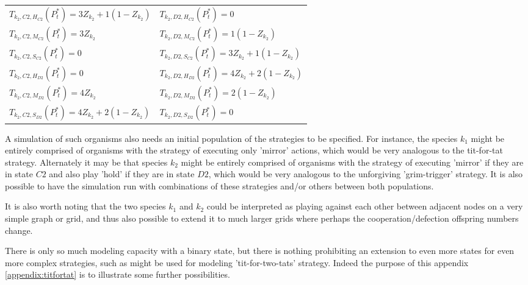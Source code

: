 \begin{itemize}[leftmargin=*,labelsep=4mm]
\begin{tabular}{ll}\hline
$T_{k_2,C2,H_{C2}}(P^*_t) = 3Z_{k_2}+1(1-Z_{k_2})$ & 	$T_{k_2,D2,H_{C2}}(P^*_t) = 0$\\
$T_{k_2,C2,M_{C2}}(P^*_t) = 3Z_{k_2}$ & 				$T_{k_2,D2,M_{C2}}(P^*_t) = 1(1-Z_{k_2})$\\
$T_{k_2,C2,S_{C2}}(P^*_t) = 0$ & 						$T_{k_2,D2,S_{C2}}(P^*_t) = 3Z_{k_2}+1(1-Z_{k_2})$\\\hline

$T_{k_2,C2,H_{D2}}(P^*_t) = 0$ & 						$T_{k_2,D2,H_{D2}}(P^*_t) = 4Z_{k_2}+2(1-Z_{k_2})$\\
$T_{k_2,C2,M_{D2}}(P^*_t) = 4Z_{k_2}$ & 				$T_{k_2,D2,M_{D2}}(P^*_t) = 2(1-Z_{k_2})$\\
$T_{k_2,C2,S_{D2}}(P^*_t) = 4Z_{k_2}+2(1-Z_{k_2})$ &	$T_{k_2,D2,S_{D2}}(P^*_t) = 0$\\\hline
\end{tabular}
\end{itemize}

A simulation of such organisms also needs an initial population of the strategies to be specified.
For instance, the species $k_1$ might be entirely comprised of organisms with the strategy of executing only 'mirror' actions, which would be very analogous to the tit-for-tat strategy.
Alternately it may be that species $k_2$ might be entirely comprised of organisms with the strategy of executing 'mirror' if they are in state $C2$ and also play 'hold' if they are in state $D2$, which would be very analogous to the unforgiving 'grim-trigger' strategy.
It is also possible to have the simulation run with combinations of these strategies and/or others between both populations.

It is also worth noting that the two species $k_1$ and $k_2$ could be interpreted as playing against each other between adjacent nodes on a very simple graph or grid, and thus also possible to extend it to much larger grids where perhaps the cooperation/defection offspring numbers change.

There is only so much modeling capacity with a binary state, but there is nothing prohibiting an extension to even more states for even more complex strategies, such as might be used for modeling 'tit-for-two-tats' strategy.
Indeed the purpose of this appendix \ref{appendix:titfortat} is to illustrate some further possibilities.


